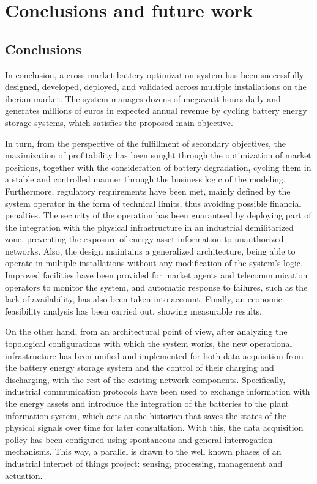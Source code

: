 \cleardoublepage%

\chapter*{Conclusions and future work}%
\label{makereference10}

\section*{Conclusions}

In conclusion, a cross-market battery optimization system has been successfully designed, developed, deployed, and validated across multiple installations on the iberian market. The system manages dozens of megawatt hours daily and generates millions of euros in expected annual revenue by cycling battery energy storage systems, which satisfies the proposed main objective.

In turn, from the perspective of the fulfillment of secondary objectives, the maximization of profitability has been sought through the optimization of market positions, together with the consideration of battery degradation, cycling them in a stable and controlled manner through the business logic of the modeling. Furthermore, regulatory requirements have been met, mainly defined by the system operator in the form of technical limits, thus avoiding possible financial penalties. The security of the operation has been guaranteed by deploying part of the integration with the physical infrastructure in an industrial demilitarized zone, preventing the exposure of energy asset information to unauthorized networks. Also, the design maintains a generalized architecture, being able to operate in multiple installations without any modification of the system's logic. Improved facilities have been provided for market agents and telecommunication operators to monitor the system, and automatic response to failures, such as the lack of availability, has also been taken into account. Finally, an economic feasibility analysis has been carried out, showing measurable results.

On the other hand, from an architectural point of view, after analyzing the topological configurations with which the system works, the new operational infrastructure has been unified and implemented for both data acquisition from the battery energy storage system and the control of their charging and discharging, with the rest of the existing network components. Specifically, industrial communication protocols have been used to exchange information with the energy assets and introduce the integration of the batteries to the plant information system, which acts as the historian that saves the states of the physical signals over time for later consultation. With this, the data acquisition policy has been configured using spontaneous and general interrogation mechanisms. This way, a parallel is drawn to the well known phases of an industrial internet of things project: sensing, processing, management and actuation.

